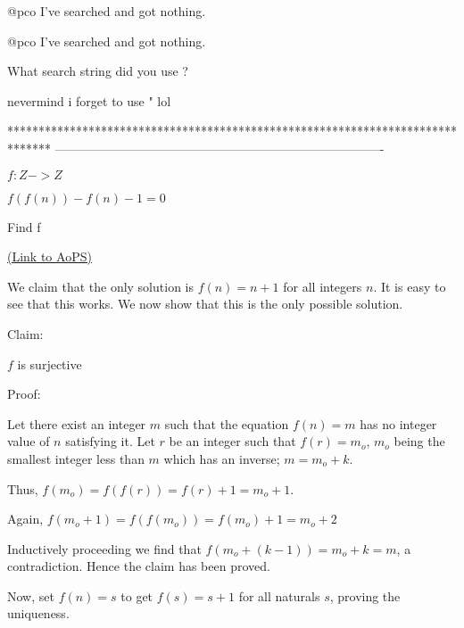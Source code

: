 \begin{solution}
	@pco I've searched and got nothing.
\end{solution}



\begin{solution}
	\begin{tcolorbox}@pco I've searched and got nothing.\end{tcolorbox}

What search string did you use ?

\end{solution}



\begin{solution}
	nevermind i forget to use " lol
\end{solution}
*******************************************************************************
-------------------------------------------------------------------------------

\begin{problem}
	$f:Z  -> Z $

$f(f(n)) - f(n) - 1 = 0$

\begin{bolded}\begin{italicized}Find f\end{italicized}\end{bolded}
	\flushright \href{https://artofproblemsolving.com/community/c6h1579145}{(Link to AoPS)}
\end{problem}



\begin{solution}
	We claim that the only solution is $f(n)=n+1$ for all integers $n$. It is easy to see that this works. We now show that this is the only possible solution.

\begin{bolded}Claim:\end{bolded} $f$ is surjective
\begin{italicized}Proof:\end{italicized} Let there exist an integer $m$ such that the equation $f(n)=m$ has no integer value of $n$ satisfying it.
Let $r$ be an integer such that $f(r)=m_{o}$, $m_{o}$ being the smallest integer less than $m$ which has an inverse; $m=m_{o}+k$.

Thus, $f(m_{o})=f(f(r))=f(r)+1=m_{o}+1$.

Again, $f(m_{o}+1)=f(f(m_{o}))=f(m_{o})+1=m_{o}+2$

Inductively proceeding we find that $f(m_{o}+(k-1))=m_{o}+k=m$, a contradiction.
Hence the claim has been proved.

Now, set $f(n)=s$ to get $f(s)=s+1$ for all naturals $s$, proving the uniqueness.
\end{solution}



